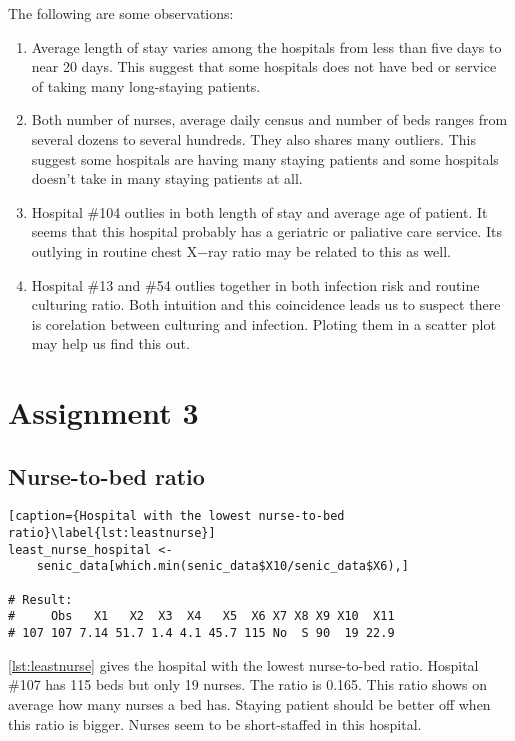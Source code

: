 \documentclass[11pt]{article}
\begin{document}
The following are some observations:
\begin{enumerate}
\item
  Average length of stay varies among the hospitals from less than five days to
  near 20 days. This suggest that some hospitals does not have bed or service of
  taking many long-staying patients.
\item
  Both number of nurses, average daily census and number of beds ranges from
  several dozens to several hundreds. They also shares many outliers. This suggest
  some hospitals are having many staying patients and some hospitals doesn't take
  in many staying patients at all.
\item
  Hospital \#104 outlies in both length of stay and average age of patient. It
  seems that this hospital probably has a geriatric or paliative care service.
  Its outlying in routine chest X−ray ratio may be related to this as well.
\item
  Hospital \#13 and \#54 outlies together in both infection risk and routine culturing
  ratio. Both intuition and this coincidence leads us to suspect there is corelation
  between culturing and infection. Ploting them in a scatter plot may help us find
  this out.
\end{enumerate}




\section{Assignment 3}

\subsection{Nurse-to-bed ratio}
\label{subsec:nurse2bed}

\begin{lstlisting}[caption={Hospital with the lowest nurse-to-bed ratio}\label{lst:leastnurse}]
least_nurse_hospital <-
    senic_data[which.min(senic_data$X10/senic_data$X6),]

# Result:
#     Obs   X1   X2  X3  X4   X5  X6 X7 X8 X9 X10  X11
# 107 107 7.14 51.7 1.4 4.1 45.7 115 No  S 90  19 22.9
\end{lstlisting}


\autoref{lst:leastnurse} gives the hospital with the lowest nurse-to-bed ratio.
Hospital \#107 has 115 beds but only 19 nurses. The ratio is 0.165. This ratio
shows on average how many nurses a bed has. Staying patient should be better off
when this ratio is bigger. Nurses seem to be short-staffed in this hospital.
\end{document}
